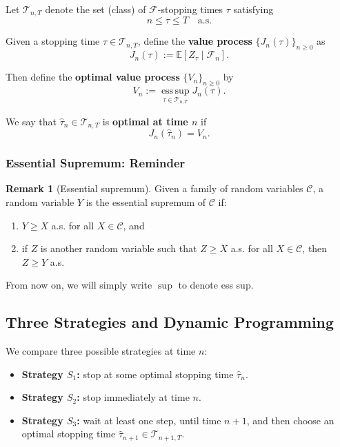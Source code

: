 \documentclass[12pt,a4paper]{article}
\theoremstyle{definition}
\newtheorem{remark}{Remark}[section]
\begin{document}
Let $\mathcal{T}_{n,T}$ denote the set (class) of $\mathcal{F}$-stopping times $\tau$ satisfying
\[
n \leq \tau \leq T \quad \text{a.s.}
\]

Given a stopping time $\tau \in \mathcal{T}_{n,T}$, define the \textbf{value process} $\{J_n(\tau)\}_{n \geq 0}$ as
\[
J_n(\tau) := \mathbb{E}[Z_\tau \mid \mathcal{F}_n].
\]

Then define the \textbf{optimal value process} $\{V_n\}_{n \geq 0}$ by
\[
V_n := \operatorname*{ess\,sup}_{\tau \in \mathcal{T}_{n,T}} J_n(\tau).
\]

We say that $\widehat{\tau}_n \in \mathcal{T}_{n,T}$ is \textbf{optimal at time $n$} if
\[
J_n(\widehat{\tau}_n) = V_n.
\]

\subsubsection{Essential Supremum: Reminder}

\begin{remark}[Essential supremum]
Given a family of random variables $\mathcal{C}$, a random variable $Y$ is the essential supremum of $\mathcal{C}$ if:
\begin{enumerate}
\item $Y \geq X$ a.s. for all $X \in \mathcal{C}$, and
\item if $Z$ is another random variable such that $Z \geq X$ a.s. for all $X \in \mathcal{C}$, then $Z \geq Y$ a.s.
\end{enumerate}
\end{remark}

From now on, we will simply write $\sup$ to denote ess sup.

\subsection{Three Strategies and Dynamic Programming}

We compare three possible strategies at time $n$:
\begin{itemize}
\item \textbf{Strategy $S_1$:} stop at some optimal stopping time $\widehat{\tau}_n$.
\item \textbf{Strategy $S_2$:} stop immediately at time $n$.
\item \textbf{Strategy $S_3$:} wait at least one step, until time $n+1$, and then choose an optimal stopping time $\widehat{\tau}_{n+1} \in \mathcal{T}_{n+1,T}$.
\end{itemize}
\end{document}
